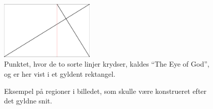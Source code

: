 {\begin{figure}[!h]
    \centering
    \includegraphics[angle=0,width=0.4\textwidth]{afsnit/fremtidigt_arbejde/billeder/eye_of_god}
    \caption[]{Punktet, hvor de to sorte linjer krydser, kaldes ``The Eye
    of God'', og er her vist i et gyldent rektangel.}
    \label{eye_of_god}
\end{figure}

\begin{figure}[!h]
    \centering
    \caption[]{Eksempel på regioner i billedet, som skulle være
    konstrueret efter det gyldne snit.}
    \label{monalisa_fake}
\end{figure}

}
